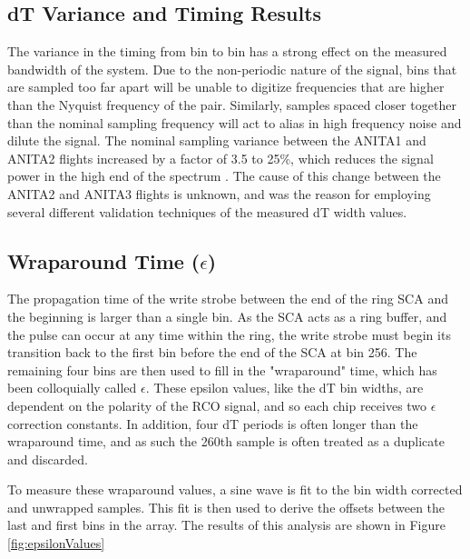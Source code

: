 	


	\subsection{dT Variance and Timing Results}	
		The variance in the timing from bin to bin has a strong effect on the measured bandwidth of the system.  Due to the non-periodic nature of the signal, bins that are sampled too far apart will be unable to digitize frequencies that are higher than the Nyquist frequency of the pair.  Similarly, samples spaced closer together than the nominal sampling frequency will act to alias in high frequency noise and dilute the signal.  The nominal sampling variance between the ANITA1 and ANITA2 flights increased by a factor of 3.5 to 25\%, which reduces the signal power in the high end of the spectrum .  The cause of this change between the ANITA2 and ANITA3 flights is unknown, and was the reason for employing several different validation techniques of the measured dT width values.
		
		
	\subsection{Wraparound Time ($\epsilon$)}
		The propagation time of the write strobe between the end of the ring SCA and the beginning is larger than a single bin.  As the SCA acts as a ring buffer, and the pulse can occur at any time within the ring, the write strobe must begin its transition back to the first bin before the end of the SCA at bin 256.  The remaining four bins are then used to fill in the "wraparound" time, which has been colloquially called $\epsilon$.  These epsilon values, like the dT bin widths, are dependent on the polarity of the RCO signal, and so each chip receives two $\epsilon$ correction constants. In addition, four dT periods is often longer than the wraparound time, and as such the 260th sample is often treated as a duplicate and discarded.
		
		To measure these wraparound values, a sine wave is fit to the bin width corrected and unwrapped samples.  This fit is then used to derive the offsets between the last and first bins in the array.  The results of this analysis are shown in Figure \ref{fig:epsilonValues}
		
